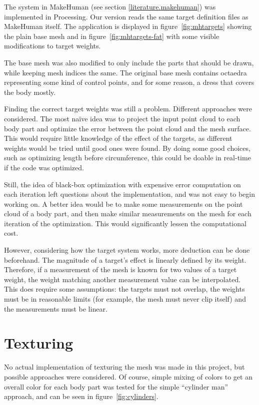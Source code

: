 The  system in MakeHuman (see section \ref{literature.makehuman}) was implemented in Processing. Our version reads the same target definition files as MakeHuman itself. The application is displayed in figure~\ref{fig:mhtargets} showing the plain base mesh and in figure~\ref{fig:mhtargets-fat} with some visible modifications to target weights.

The base mesh was also modified to only include the parts that should be drawn, while keeping mesh indices the same. The original base mesh contains octaedra representing some kind of control points, and for some reason, a dress that covers the body mostly.

\newtopic

Finding the correct target weights was still a problem. Different approaches were considered. The most naïve idea was to project the input point cloud to each body part and optimize the error between the point cloud and the mesh surface. This would require little knowledge of the effect of the targets, as different weights would be tried until good ones were found. By doing some good choices, such as optimizing length before circumference, this could be doable in real-time if the code was optimized.

Still, the idea of black-box optimization with expensive error computation on each iteration left questions about the implementation, and was not easy to begin working on. A better idea would be to make some measurements on the point cloud of a body part, and then make similar measurements on the mesh for each iteration of the optimization. This would significantly lessen the computational cost.

However, considering how the target system works, more deduction can be done beforehand. The magnitude of a target's effect is linearly defined by its weight. Therefore, if a measurement of the mesh is known for two values of a target weight, the weight matching another measurement value can be interpolated. This does require some assumptions: the targets must not overlap, the weights must be in reasonable limits (for example, the mesh must never clip itself) and the measurements must be linear.


\section{Texturing}

No actual implementation of texturing the mesh was made in this project, but possible approaches were considered. Of course, simple mixing of colors to get an overall color for each body part was tested for the simple ``cylinder man'' approach, and can be seen in figure~\ref{fig:cylinders}.

